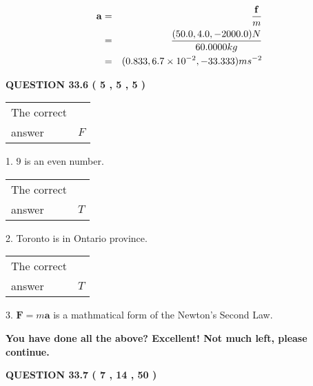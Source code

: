 \documentclass[12pt]{article}
\begin{document}
\begin{eqnarray*}
\mathbf{a}&=&\frac{\mathbf{f}}m  \\
&=&\frac{ %
(50.0 , 4.0 , -2000.0) N}{ %
60.0000kg}  \\
&=& %
(0.833 , 6.7 \times 10^{-2} , -33.333) ms^{-2}
\end{eqnarray*}
 
 
 
  
\vspace{0.2in}
  
{\textbf{\Large{QUESTION
33.6 
 (           5 ,           5 ,           5 )
}}}
  
  
 
 
\noindent{}

 
\noindent\begin{tabular}{|l|l|}\hline The correct & \\
          answer &  %
$F$ \\ \hline \end{tabular}
1. $ %
9$ is an  %
even number.
 
\noindent\begin{tabular}{|l|l|}\hline The correct & \\
          answer &  %
$T$ \\ \hline \end{tabular}
2.  %
Toronto is in  %
Ontario province.
 
\noindent\begin{tabular}{|l|l|}\hline The correct & \\
          answer &  %
$T$ \\ \hline \end{tabular}
3.  %
$\mathbf{F}=m\mathbf{a}$ is a mathmatical form of  %
the Newton's Second Law.
 
 
 
   
   
\vspace{0.3in}
{\textbf{\LARGE{You have done all the above? Excellent! Not much left, please continue.}}}
\vspace{0.3in}
   
   
  
\vspace{0.2in}
  
{\textbf{\Large{QUESTION
33.7 
 (           7 ,          14 ,          50 )
}}}
  
  
 
 
\noindent{}
 
\end{document}
